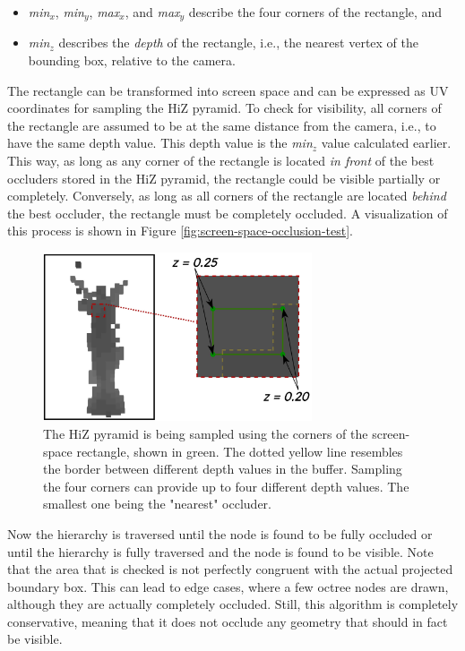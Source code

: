 \begin{itemize}
    \item \emph{min$_{x}$}, \emph{min$_{y}$}, \emph{max$_{x}$}, and \emph{max$_{y}$} describe the four corners of the rectangle, and
    \item \emph{min$_{z}$} describes the \emph{depth} of the rectangle, i.e., the nearest vertex of the bounding box, relative to the camera.
\end{itemize}

\noindent
The rectangle can be transformed into screen space and can be expressed as UV coordinates for sampling the 
\ac{HiZ} pyramid. To check for visibility, all corners of the rectangle are assumed to be at the same distance 
from the camera, i.e., to have the same depth value. This depth value is the \emph{min$_{z}$} value calculated earlier.
This way, as long as any corner of the rectangle is located \emph{in front} of the best occluders stored in the 
\ac{HiZ} pyramid, the rectangle could be visible partially or completely. Conversely, as long as all corners of 
the rectangle are located \emph{behind} the best occluder, the rectangle must be completely occluded. A visualization of 
this process is shown in Figure \ref{fig:screen-space-occlusion-test}.

\begin{figure}[htbp]
    \centering
    \includegraphics[width=300px]{images/graphics/visibility-hiz-sampling.jpg}
    \caption{The \ac{HiZ} pyramid is being sampled using the corners of the screen-space rectangle, shown in green. 
    The dotted yellow line resembles the border between different depth values in the buffer. Sampling the four 
    corners can provide up to four different depth values. The smallest one being the "nearest" occluder.}
    \label{fig:visibility-hiz-sampling}
\end{figure}


\noindent
Now the hierarchy is traversed until the node is found to be fully occluded or until the hierarchy is fully traversed 
and the node is found to be visible. Note that the area that is checked is not perfectly congruent with the actual 
projected boundary box. This can lead to edge cases, where a few octree nodes are drawn, although they are actually 
completely occluded. Still, this algorithm is completely conservative, meaning that it does not occlude any geometry 
that should in fact be visible. \\

